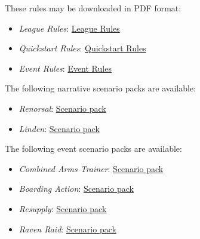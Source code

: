These rules may be downloaded in PDF format:

\begin{itemize}

\item \emph{League Rules}: \href{https://raw.githubusercontent.com/Eudicods/outworlds-wastes/rules-pdf/battletech-outworlds-wastes.pdf}{League Rules}

\item \emph{Quickstart Rules}: \href{https://raw.githubusercontent.com/Eudicods/outworlds-wastes/rules-pdf/battletech-outworlds-wastes-quickstart.pdf}{Quickstart Rules}

\item \emph{Event Rules}: \href{https://raw.githubusercontent.com/Eudicods/outworlds-wastes/rules-pdf/battletech-outworlds-wastes-event.pdf}{Event Rules}

\end{itemize}

The following narrative scenario packs are available:

\begin{itemize}

\item \emph{Renorsal}: \href{https://raw.githubusercontent.com/Eudicods/outworlds-wastes/rules-pdf/renorsal.pdf}{Scenario pack}

\item \emph{Linden}: \href{https://raw.githubusercontent.com/Eudicods/outworlds-wastes/rules-pdf/linden.pdf}{Scenario pack}

\end{itemize}

The following event scenario packs are available:

\begin{itemize}

\item \emph{Combined Arms Trainer}: \href{https://raw.githubusercontent.com/Eudicods/outworlds-wastes/rules-pdf/combined-arms-trainer.pdf}{Scenario pack}

\item \emph{Boarding Action}: \href{https://raw.githubusercontent.com/Eudicods/outworlds-wastes/rules-pdf/boarding-action.pdf}{Scenario pack}

\item \emph{Resupply}: \href{https://raw.githubusercontent.com/Eudicods/outworlds-wastes/rules-pdf/resupply.pdf}{Scenario pack}

\item \emph{Raven Raid}: \href{https://raw.githubusercontent.com/Eudicods/outworlds-wastes/rules-pdf/raven-raid.pdf}{Scenario pack}

\end{itemize}

